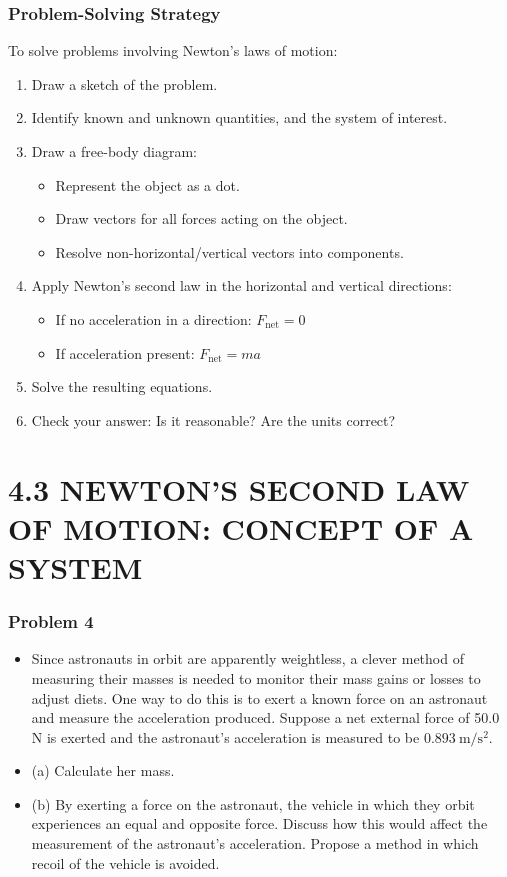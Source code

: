 \documentclass{beamer}
\begin{document}
\begin{frame}
\frametitle{Problem-Solving Strategy}
To solve problems involving Newton's laws of motion:
\begin{enumerate}
    \item Draw a sketch of the problem.
    \item Identify known and unknown quantities, and the system of interest.
    \item Draw a free-body diagram:
    \begin{itemize}
        \item Represent the object as a dot.
        \item Draw vectors for all forces acting on the object.
        \item Resolve non-horizontal/vertical vectors into components.
    \end{itemize}
    \item Apply Newton's second law in the horizontal and vertical directions:
    \begin{itemize}
        \item If no acceleration in a direction: $F_{\text{net}} = 0$
        \item If acceleration present: $F_{\text{net}} = ma$
    \end{itemize}
    \item Solve the resulting equations.
    \item Check your answer: Is it reasonable? Are the units correct?
\end{enumerate}
\end{frame}

\section{4.3 NEWTON'S SECOND LAW OF MOTION: CONCEPT OF A SYSTEM}

\begin{frame}
\frametitle{Problem 4}
\begin{itemize}
    \item Since astronauts in orbit are apparently weightless, a clever method of measuring their masses is needed to monitor their mass gains or losses to adjust diets. One way to do this is to exert a known force on an astronaut and measure the acceleration produced. Suppose a net external force of 50.0 N is exerted and the astronaut's acceleration is measured to be $0.893 \mathrm{~m} / \mathrm{s}^{2}$.
    \item (a) Calculate her mass.
    \item (b) By exerting a force on the astronaut, the vehicle in which they orbit experiences an equal and opposite force. Discuss how this would affect the measurement of the astronaut's acceleration. Propose a method in which recoil of the vehicle is avoided.
\end{itemize}
\end{frame}
\end{document}
